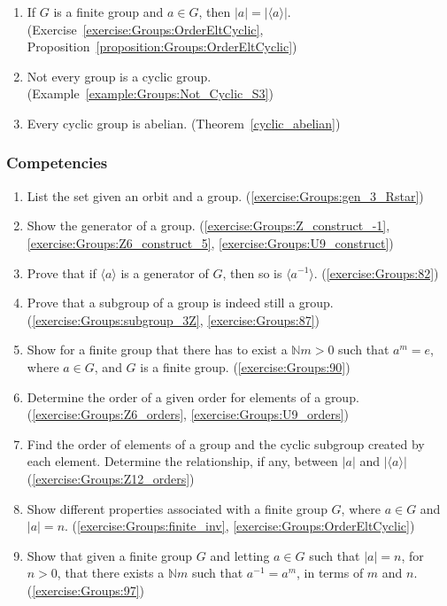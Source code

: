 \begin{enumerate}
\item
If $G$ is a finite group and $a \in G$, then $|a| = |\langle a \rangle|$. (Exercise~\ref{exercise:Groups:OrderEltCyclic}, Proposition~\ref{proposition:Groups:OrderEltCyclic})

\item
Not every group is a cyclic group. (Example~\ref{example:Groups:Not_Cyclic_S3})

\item
Every cyclic group is abelian. (Theorem~\ref{cyclic_abelian})

\end{enumerate}

\subsubsection*{Competencies}
\begin{enumerate}
\item
List the set given an orbit and a group.  (\ref{exercise:Groups:gen_3_Rstar})

\item
Show the generator of a group.  (\ref{exercise:Groups:Z_construct_-1}, \ref{exercise:Groups:Z6_construct_5}, \ref{exercise:Groups:U9_construct})

\item
Prove that if $\langle a \rangle$ is a generator of $G$, then so is $\langle a^{-1} \rangle$. (\ref{exercise:Groups:82})

\item
Prove that a subgroup of a group is indeed still a group.  (\ref{exercise:Groups:subgroup_3Z}, \ref{exercise:Groups:87})

\item
Show for a finite group that there has to exist a ${\mathbb N} m > 0$ such that $a^m = e$, where $a \in G$, and $G$ is a finite group. (\ref{exercise:Groups:90})

\item
Determine the order of a given order for elements of a group. (\ref{exercise:Groups:Z6_orders}, \ref{exercise:Groups:U9_orders})

\item
Find the order of elements of a group and the cyclic subgroup created by each element.  Determine the relationship, if any, between $|a|$ and $|\langle a \rangle|$ (\ref{exercise:Groups:Z12_orders})

\item
Show different properties associated with a finite group $G$, where $a \in G$ and $|a| = n$. (\ref{exercise:Groups:finite_inv}, \ref{exercise:Groups:OrderEltCyclic})

\item
Show that given a finite group $G$ and letting $a \in G$ such that $|a| = n$, for $n > 0$, that there exists a ${\mathbb N} m$ such that $a^{-1} = a^m$, in terms of $m$ and $n$. (\ref{exercise:Groups:97})

\end{enumerate}


